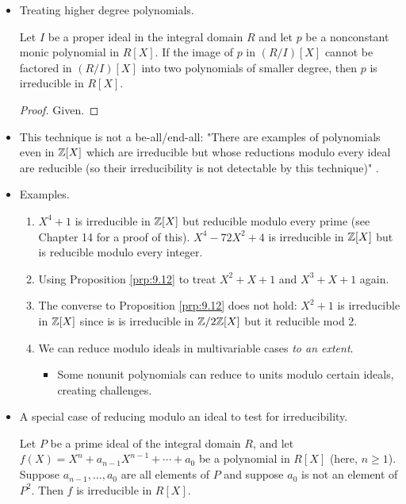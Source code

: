 \documentclass[../notes.tex]{subfiles}
\begin{document}
\begin{itemize}
\begin{enumerate}
    \end{enumerate}
    \item Treating higher degree polynomials.
    \begin{proposition}\label{prp:9.12}
        Let $I$ be a proper ideal in the integral domain $R$ and let $p$ be a nonconstant monic polynomial in $R[X]$. If the image of $p$ in $(R/I)[X]$ cannot be factored in $(R/I)[X]$ into two polynomials of smaller degree, then $p$ is irreducible in $R[X]$.
        \begin{proof}
            Given.
        \end{proof}
    \end{proposition}
    \item This technique is not a be-all/end-all: "There are examples of polynomials even in $\mathbb{Z}[X]$ which are irreducible but whose reductions modulo every ideal are reducible (so their irreducibility is not detectable by this technique)" \parencite[309]{bib:DummitFoote}.
    \item Examples.
    \begin{enumerate}[start=0]
        \item $X^4+1$ is irreducible in $\mathbb{Z}[X]$ but reducible modulo every prime (see Chapter 14 for a proof of this). $X^4-72X^2+4$ is irreducible in $\mathbb{Z}[X]$ but is reducible modulo every integer.
        \item Using Proposition \ref{prp:9.12} to treat $X^2+X+1$ and $X^3+X+1$ again.
        \item The converse to Proposition \ref{prp:9.12} does not hold: $X^2+1$ is irreducible in $\mathbb{Z}[X]$ since is is irreducible in $\mathbb{Z}/2\mathbb{Z}[X]$ but it reducible mod 2.
        \item We can reduce modulo ideals in multivariable cases \emph{to an extent}.
        \begin{itemize}
            \item Some nonunit polynomials can reduce to units modulo certain ideals, creating challenges.
        \end{itemize}
    \end{enumerate}
    \item A special case of reducing modulo an ideal to test for irreducibility.
    \begin{proposition}\label{prp:9.13}
        Let $P$ be a prime ideal of the integral domain $R$, and let $f(X)=X^n+a_{n-1}X^{n-1}+\cdots+a_0$ be a polynomial in $R[X]$ (here, $n\geq 1$). Suppose $a_{n-1},\dots,a_0$ are all elements of $P$ and suppose $a_0$ is not an element of $P^2$. Then $f$ is irreducible in $R[X]$.

\end{proposition}
\end{itemize}
\end{document}
